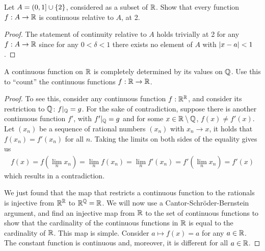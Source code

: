\begin{exercise}{10}
Let $A=(0,1]\cup \{2\}$, considered as a subset of $\mathbb{R}$.
Show that every function $f:A\to\mathbb{R}$ is continuous relative to $A$, at 2.
\end{exercise}
\begin{proof}
The statement of continuity relative to $A$ holds trivially at 2 for any $f:A\to\mathbb{R}$ since for any $0<\delta<1$ there exists no element of $A$ with $\left\lvert x-a\right\rvert<1$.
\end{proof} 

\begin{exercise}{14}
A continuous function on $\mathbb{R}$ is completely determined by its values on $\mathbb{Q}$.
Use this to ``count'' the continuous functions $f:\mathbb{R}\to\mathbb{R}$.
\end{exercise}
\begin{proof}
To see this, consider any continuous function $f:\mathbb{R}^{\mathbb{R}}$, and consider its restriction to $\mathbb{Q}$: $f|_{\mathbb{Q}} = g$.
For the sake of contradiction, suppose there is another continuous function $f'$, with $f'|_{\mathbb{Q}} = g$ and for some $x \in \mathbb{R}\setminus\mathbb{Q}$, $f(x)\neq f'(x)$.
Let $(x_n)$ be a sequence of rational numbers $(x_n)$ with $x_n \to x$, it holds that $f(x_n)=f'(x_n)$ for all $n$.
Taking the limits on both sides of the equality gives us 
\begin{align*}
    f(x) = f(\lim_n x_n) = \lim_n f(x_n) =
    \lim_n f'(x_n) =  f'(\lim_n x_n) = f'(x)  
\end{align*}
which results in a contradiction.

We just found that the map that restricts a continuous function to the rationals is injective from $\mathbb{R}^{\mathbb{R}}$ to $\mathbb{R}^{\mathbb{Q}}=\mathbb{R}$.
We will now use a Cantor-Schr\"oder-Bernstein argument, and find an injective map from $\mathbb{R}$ to the set of continuous functions to show that the cardinality of the continuous functions in $\mathbb{R}$ is equal to the cardinality of $\mathbb{R}$.
This map is simple.
Consider $a \mapsto f(x)=a$ for any $a \in\mathbb{R}$.
The constant function is continuous and, moreover, it is different for all $a\in\mathbb{R}$.
\end{proof} 

